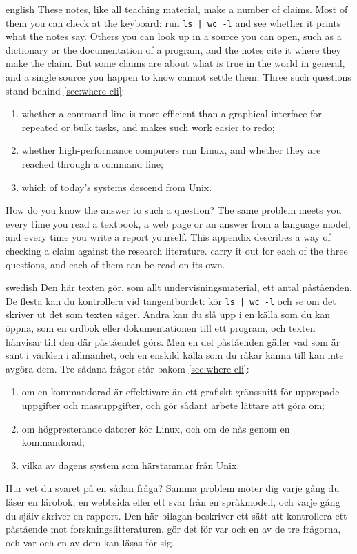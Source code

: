 \begin{onlyin}{english} %
These notes, like all teaching material, make a number of claims.  Most
of them you can check at the keyboard: run \texttt{ls | wc -l} and see
whether it prints what the notes say.  Others you can look up in a
source you can open, such as a dictionary or the documentation of a
program, and the notes cite it where they make the claim.  But some
claims are about what is true in the world in general, and a single
source you happen to know cannot settle them.  Three such questions
stand behind \cref{sec:where-cli}:
\begin{enumerate}
  \item whether a command line is more efficient than a graphical
    interface for repeated or bulk tasks, and makes such work easier to
    redo;
  \item whether high-performance computers run Linux, and whether they
    are reached through a command line;
  \item which of today's systems descend from Unix.
\end{enumerate}
How do you know the answer to such a question?  The same problem meets
you every time you read a textbook, a web page or an answer from a
language model, and every time you write a report yourself.  This
appendix describes a way of checking a claim against the research
literature.  
carry it out for each of the three questions, and each of them can be
read on its own.
\end{onlyin}
\begin{onlyin}{swedish}
Den här texten gör, som allt undervisningsmaterial, ett antal
påståenden.  De flesta kan du kontrollera vid tangentbordet: kör
\texttt{ls | wc -l} och se om det skriver ut det som texten säger.
Andra kan du slå upp i en källa som du kan öppna, som en ordbok eller
dokumentationen till ett program, och texten hänvisar till den där
påståendet görs.  Men en del påståenden gäller vad som är sant i
världen i allmänhet, och en enskild källa som du råkar känna till kan
inte avgöra dem.  Tre sådana frågor står bakom \cref{sec:where-cli}:
\begin{enumerate}
  \item om en kommandorad är effektivare än ett grafiskt gränssnitt för
    upprepade uppgifter och massuppgifter, och gör sådant arbete lättare
    att göra om;
  \item om högpresterande datorer kör Linux, och om de nås genom en
    kommandorad;
  \item vilka av dagens system som härstammar från Unix.
\end{enumerate}
Hur vet du svaret på en sådan fråga?  Samma problem möter dig varje gång
du läser en lärobok, en webbsida eller ett svar från en språkmodell, och
varje gång du själv skriver en rapport.  Den här bilagan beskriver ett
sätt att kontrollera ett påstående mot forskningslitteraturen.
 gör det för var
och en av de tre frågorna, och var och en av dem kan läsas för sig.
\end{onlyin}

